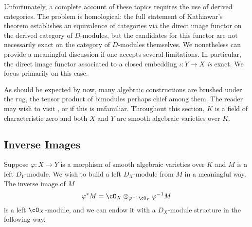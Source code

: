Unfortunately, a complete account of these topics requires the use of derived categories. The problem is homological: the full statement of Kathiawar's theorem establishes an equivalence of categories via the direct image functor on the derived category of $D$-modules, but the candidates for this functor are not necessarily exact on the category of $D$-modules themselves. We nonetheless can provide a meaningful discussion if one accepts several limitations. In particular, the direct image functor associated to a closed embedding $\iota:Y\to X$ \emph{is} exact. We focus primarily on this case.

As should be expected by now, many algebraic constructions are brushed under the rug, the tensor product of bimodules perhaps chief among them. The reader may wish to visit \cite{d-mod-primer}, \cite{d-mod_ps-rt} or \cite{ginzburg_d-mod} if this is unfamiliar. Throughout this section, $K$ is a field of characteristic zero and both $X$ and $Y$ are smooth algebraic varieties over $K$. 

\subsection{Inverse Images}
Suppose $\varphi:X\to Y$ is a morphism of smooth algebraic varieties over $K$ and $M$ is a left $D_Y$-module. We wish to build a left $D_X$-module from $M$ in a meaningful way. The inverse image of $M$
\begin{align*}
	\varphi^*M = \cO_X \otimes_{\varphi^{-1}\cO_Y} \varphi^{-1}M
\end{align*}
is a left $\cO_X$-module, and we can endow it with a $D_X$-module structure in the following way.

